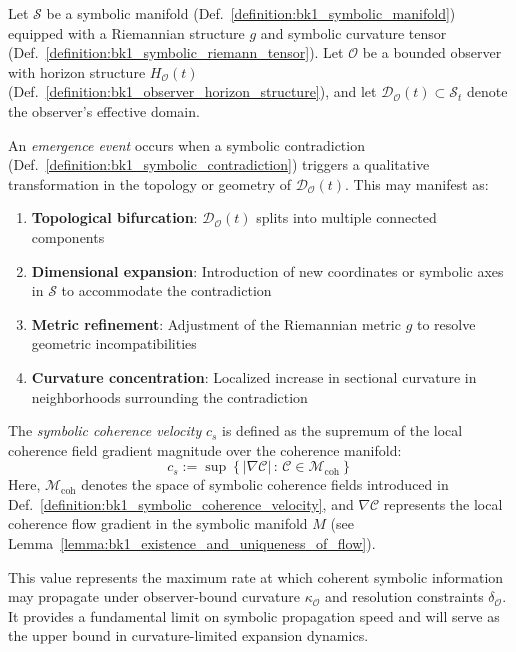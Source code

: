 \begin{definition}
\label{definition:bk1_emergence_event}
Let $\mathcal{S}$ be a symbolic manifold (Def.~\ref{definition:bk1_symbolic_manifold}) equipped with a Riemannian structure $g$ and symbolic curvature tensor (Def.~\ref{definition:bk1_symbolic_riemann_tensor}). Let $\mathcal{O}$ be a bounded observer with horizon structure $H_\mathcal{O}(t)$ (Def.~\ref{definition:bk1_observer_horizon_structure}), and let $\mathcal{D}_\mathcal{O}(t) \subset \mathcal{S}_t$ denote the observer's effective domain.

An \emph{emergence event} occurs when a symbolic contradiction (Def.~\ref{definition:bk1_symbolic_contradiction}) triggers a qualitative transformation in the topology or geometry of $\mathcal{D}_\mathcal{O}(t)$. This may manifest as:
\begin{enumerate}
    \item \textbf{Topological bifurcation}: $\mathcal{D}_\mathcal{O}(t)$ splits into multiple connected components
    \item \textbf{Dimensional expansion}: Introduction of new coordinates or symbolic axes in $\mathcal{S}$ to accommodate the contradiction
    \item \textbf{Metric refinement}: Adjustment of the Riemannian metric $g$ to resolve geometric incompatibilities
    \item \textbf{Curvature concentration}: Localized increase in sectional curvature in neighborhoods surrounding the contradiction
\end{enumerate}
\end{definition}

\begin{definition}
\label{definition:bk1_symbolic_coherence_velocity}
The \emph{symbolic coherence velocity} $c_s$ is defined as the supremum of the local coherence field gradient magnitude over the coherence manifold:
\[
c_s := \sup \left\{ \left| \nabla \mathcal{C} \right| \,:\, \mathcal{C} \in \mathcal{M}_{\text{coh}} \right\}
\]
Here, $\mathcal{M}_{\text{coh}}$ denotes the space of symbolic coherence fields introduced in Def.~\ref{definition:bk1_symbolic_coherence_velocity}, and $\nabla \mathcal{C}$ represents the local coherence flow gradient in the symbolic manifold $M$ (see Lemma~\ref{lemma:bk1_existence_and_uniqueness_of_flow}).

This value represents the maximum rate at which coherent symbolic information may propagate under observer-bound curvature $\kappa_\mathcal{O}$ and resolution constraints $\delta_\mathcal{O}$. It provides a fundamental limit on symbolic propagation speed and will serve as the upper bound in curvature-limited expansion dynamics.
\end{definition}

